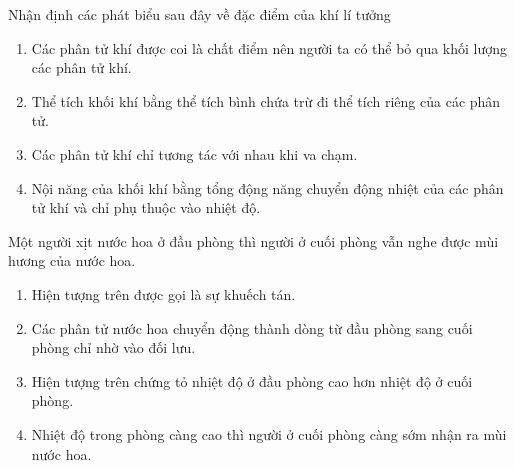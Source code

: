 \begin{ex}
	Nhận định các phát biểu sau đây về đặc điểm của khí lí tưởng
	\begin{enumerate}[label=\alph*)]
		\item Các phân tử khí được coi là chất điểm nên người ta có thể bỏ qua khối lượng các phân tử khí.
		\item Thể tích khối khí bằng thể tích bình chứa trừ đi thể tích riêng của các phân tử.
		\item Các phân tử khí chỉ tương tác với nhau khi va chạm.
		\item Nội năng của khối khí bằng tổng động năng chuyển động nhiệt của các phân tử khí và chỉ phụ thuộc vào nhiệt độ.
	\end{enumerate}
	
\end{ex}
\begin{ex}
	Một người xịt nước hoa ở đầu phòng thì người ở cuối phòng vẫn nghe được mùi hương của nước hoa.
	\begin{enumerate}[label=\alph*)]
		\item Hiện tượng trên được gọi là sự khuếch tán.
		\item Các phân tử nước hoa chuyển động thành dòng từ đầu phòng sang cuối phòng chỉ nhờ vào đối lưu.
		\item Hiện tượng trên chứng tỏ nhiệt độ ở đầu phòng cao hơn nhiệt độ ở cuối phòng.
		\item Nhiệt độ trong phòng càng cao thì người ở cuối phòng càng sớm nhận ra mùi nước hoa.
	\end{enumerate}
	
\end{ex}
